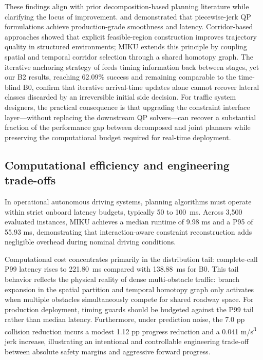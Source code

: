These findings align with prior decomposition-based planning literature while clarifying the locus of improvement. \citet{fan2018baidu} and \citet{zhang2020pathqp} demonstrated that piecewise-jerk QP formulations achieve production-grade smoothness and latency. Corridor-based approaches \citep{liu2017sfc,yoon2024stcorridor} showed that explicit feasible-region construction improves trajectory quality in structured environments; MIKU extends this principle by coupling spatial and temporal corridor selection through a shared homotopy graph. The iterative anchoring strategy of \citet{chen2019em} feeds timing information back between stages, yet our B2 results, reaching 62.09\% success and remaining comparable to the time-blind B0, confirm that iterative arrival-time updates alone cannot recover lateral classes discarded by an irreversible initial side decision. For traffic system designers, the practical consequence is that upgrading the constraint interface layer---without replacing the downstream QP solvers---can recover a substantial fraction of the performance gap between decomposed and joint planners while preserving the computational budget required for real-time deployment.

\subsection{Computational efficiency and engineering trade-offs}

In operational autonomous driving systems, planning algorithms must operate within strict onboard latency budgets, typically 50 to 100~ms. Across 3,500 evaluated instances, MIKU achieves a median runtime of 9.98 ms and a P95 of 55.93 ms, demonstrating that interaction-aware constraint reconstruction adds negligible overhead during nominal driving conditions.

Computational cost concentrates primarily in the distribution tail: complete-call P99 latency rises to 221.80~ms compared with 138.88~ms for B0. This tail behavior reflects the physical reality of dense multi-obstacle traffic: branch expansion in the spatial partition and temporal homotopy graph only activates when multiple obstacles simultaneously compete for shared roadway space. For production deployment, timing guards should be budgeted against the P99 tail rather than median latency. Furthermore, under prediction noise, the 7.0 pp collision reduction incurs a modest 1.12 pp progress reduction and a 0.041 m/s\textsuperscript{3} jerk increase, illustrating an intentional and controllable engineering trade-off between absolute safety margins and aggressive forward progress.

